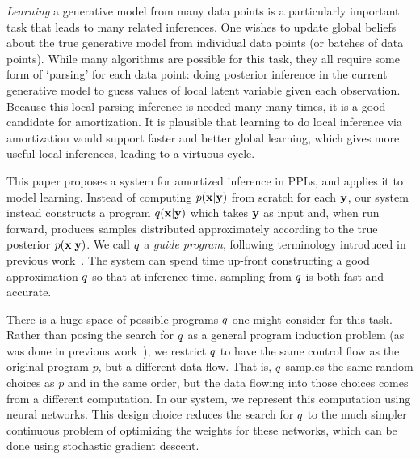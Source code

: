 \emph{Learning} a generative model from many data points is a particularly important task that leads to many related inferences.
One wishes to update global beliefs about the true generative model from individual data points (or batches of data points).
While many algorithms are possible for this task, they all require some form of  `parsing' for each data point: doing posterior inference in the current generative model to guess values of local latent variable given each observation.
Because this local parsing inference is needed many many times, it is a good candidate for amortization.
It is plausible that learning to do local inference via amortization would support faster and better global learning, which gives more useful local inferences, leading to a virtuous cycle.


This paper proposes a system for amortized inference in PPLs, and applies it to model learning. Instead of computing $p(\mathbf{x} | \mathbf{y})$ from scratch for each $\mathbf{y}$, our system instead constructs a program $q(\mathbf{x} | \mathbf{y})$ which takes $\mathbf{y}$ as input and, when run forward, produces samples distributed approximately according to the true posterior $p(\mathbf{x} | \mathbf{y})$.
We call $q$ a \emph{guide program}, following terminology introduced in previous work~\cite{GuidePrograms}.
The system can spend time up-front constructing a good approximation $q$ so that at inference time, sampling from $q$ is both fast and accurate.

There is a huge space of possible programs $q$ one might consider for this task. Rather than posing the search for $q$ as a general program induction problem (as was done in previous work~\cite{GuidePrograms}), we restrict $q$ to have the same control flow as the original program $p$, but a different data flow.
That is, $q$ samples the same random choices as $p$ and in the same order, but the data flowing into those choices comes from a different computation.
In our system, we represent this computation using neural networks.
This design choice reduces the search for $q$ to the much simpler continuous problem of optimizing the weights for these networks, which can be done using stochastic gradient descent.



